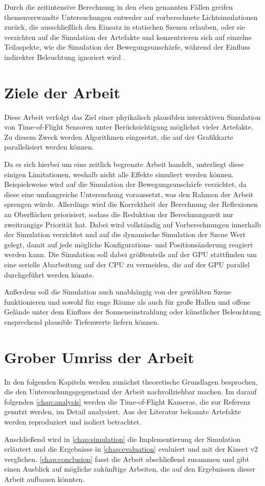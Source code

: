 \documentclass[thesis.tex]{subfiles}
\begin{document}
Durch die zeitintensive Berechnung in den eben genannten Fällen greifen themenverwandte Untersuchungen entweder auf vorberechnete Lichtsimulationen zurück, die ausschließlich den Einsatz in statischen Szenen erlauben, oder sie verzichten auf die Simulation der Artefakte und konzentrieren sich auf einzelne Teilaspekte, wie die Simulation der Bewegungsunschärfe, während der Einfluss indirekter Beleuchtung ignoriert wird \cite{bib:Keller2015}\cite{bib:Lambers2015}.

\section{Ziele der Arbeit}

Diese Arbeit verfolgt das Ziel einer phyikalisch plausiblen interaktiven Simulation von Time-of-Flight Sensoren unter Berücksichtigung möglichst vieler Artefakte. Zu diesem Zweck werden Algorithmen eingesetzt, die auf der Grafikkarte parallelisiert werden können. 

Da es sich hierbei um eine zeitlich begrenzte Arbeit handelt, unterliegt diese einigen Limitationen, weshalb nicht alle Effekte simuliert werden können. Beispielsweise wird auf die Simulation der Bewegungsunschärfe verzichtet, da diese eine umfangreiche Untersuchung voraussetzt, was den Rahmen der Arbeit sprengen würde. Allerdings wird die Korrektheit der Berechnung der Reflexionen an Oberflächen priorisiert, sodass die Reduktion der Berechnungszeit nur zweitrangige Priorität hat. Dabei wird vollständig auf Vorberechnungen innerhalb der Simulation verzichtet und auf die dynamische Simulation der Szene Wert gelegt, damit auf jede mögliche Konfigurations- und Positionsänderung reagiert werden kann. Die Simulation soll dabei größtenteils auf der GPU stattfinden um eine serielle Abarbeitung auf der CPU zu vermeiden, die auf der GPU parallel durchgeführt werden könnte.

Außerdem soll die Simulation auch unabhängig von der gewählten Szene funktionieren und sowohl für enge Räume als auch für große Hallen und offene Gelände unter dem Einfluss der Sonneneinstrahlung oder künstlicher Beleuchtung ensprechend plausible Tiefenwerte liefern können.

\section{Grober Umriss der Arbeit}

In den folgenden Kapiteln werden zunächst theoretische Grundlagen besprochen, die den Untersuchungsgegenstand der Arbeit nachvollziehbar machen. Im darauf folgenden \autoref{chap:analysis} werden die Time-of-Flight Kameras, die zur Referenz genutzt werden, im Detail analysiert. Aus der Literatur bekannte Artefakte werden reproduziert und isoliert betrachtet.

Anschließend wird in \autoref{chap:simulation} die Implementierung der Simulation erläutert und die Ergebnisse in \autoref{chap:evaluation} evaluiert und mit der Kinect v2 verglichen. \autoref{chap:conclusion} fasst die Arbeit abschließend zusammen und gibt einen Ausblick auf mögliche zukünftige Arbeiten, die auf den Ergebnissen dieser Arbeit aufbauen könnten.

\subfilebib %
\end{document}
